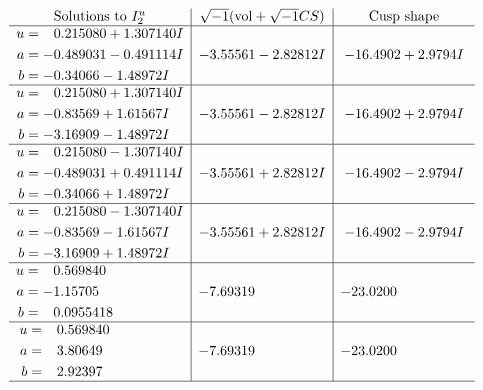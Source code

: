 \documentclass[1p]{elsarticle_modified}
\theoremstyle{definition}
\newcommand{\I}{\sqrt{-1}}
\begin{document}
$$\begin{array}{c|c|c}  
\text{Solutions to }I^u_{2}& \I (\text{vol} + \sqrt{-1}CS) & \text{Cusp shape}\\
 \hline 
\begin{aligned}
u &= \phantom{-}0.215080 + 1.307140 I \\
a &= -0.489031 - 0.491114 I \\
b &= -0.34066 - 1.48972 I\end{aligned}
 & -3.55561 - 2.82812 I & -16.4902 + 2.9794 I \\ \hline\begin{aligned}
u &= \phantom{-}0.215080 + 1.307140 I \\
a &= -0.83569 + 1.61567 I \\
b &= -3.16909 - 1.48972 I\end{aligned}
 & -3.55561 - 2.82812 I & -16.4902 + 2.9794 I \\ \hline\begin{aligned}
u &= \phantom{-}0.215080 - 1.307140 I \\
a &= -0.489031 + 0.491114 I \\
b &= -0.34066 + 1.48972 I\end{aligned}
 & -3.55561 + 2.82812 I & -16.4902 - 2.9794 I \\ \hline\begin{aligned}
u &= \phantom{-}0.215080 - 1.307140 I \\
a &= -0.83569 - 1.61567 I \\
b &= -3.16909 + 1.48972 I\end{aligned}
 & -3.55561 + 2.82812 I & -16.4902 - 2.9794 I \\ \hline\begin{aligned}
u &= \phantom{-}0.569840\phantom{ +0.000000I} \\
a &= -1.15705\phantom{ +0.000000I} \\
b &= \phantom{-}0.0955418\phantom{ +0.000000I}\end{aligned}
 & -7.69319\phantom{ +0.000000I} & -23.0200\phantom{ +0.000000I} \\ \hline\begin{aligned}
u &= \phantom{-}0.569840\phantom{ +0.000000I} \\
a &= \phantom{-}3.80649\phantom{ +0.000000I} \\
b &= \phantom{-}2.92397\phantom{ +0.000000I}\end{aligned}
 & -7.69319\phantom{ +0.000000I} & -23.0200\phantom{ +0.000000I}\\
 \hline 
 \end{array}$$\newpage\newpage\renewcommand{\arraystretch}{1}
\end{document}

